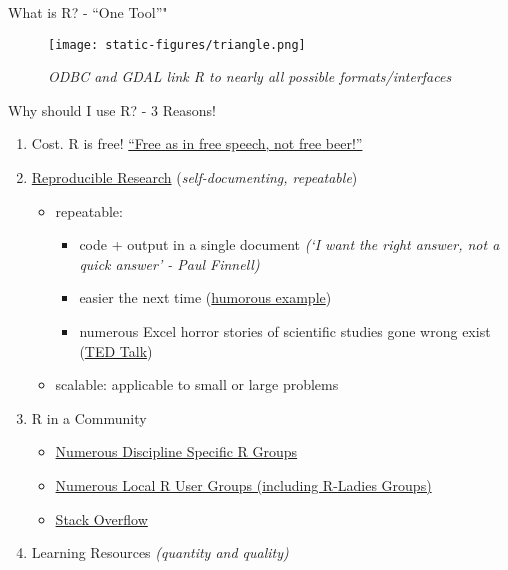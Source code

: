 \documentclass[
  ignorenonframetext,
]{beamer}
\providecommand{\tightlist}{%
  \setlength{\itemsep}{0pt}\setlength{\parskip}{0pt}}
\begin{document}
\begin{frame}{What is R? - ``One Tool''"}
\protect\hypertarget{what-is-r---one-tool}{}
\begin{figure}
\centering
\texttt{[image: static-figures/triangle.png]}
\caption{\emph{ODBC and GDAL link R to nearly all possible
formats/interfaces}}
\end{figure}
\end{frame}

\begin{frame}{Why should I use R? - 3 Reasons!}
\protect\hypertarget{why-should-i-use-r---3-reasons}{}
\begin{enumerate}
\item
  Cost. R is free!
  \href{https://www.gnu.org/philosophy/free-sw.html}{``Free as in free
  speech, not free beer!''}
\item
  \href{http://christophergandrud.github.io/RepResR-RStudio/}{Reproducible
  Research} (\emph{self-documenting, repeatable})

  \begin{itemize}
  \tightlist
  \item
    repeatable:

    \begin{itemize}
    \tightlist
    \item
      code + output in a single document \emph{(`I want the right
      answer, not a quick answer' - Paul Finnell)}
    \item
      easier the next time
      (\href{https://www.youtube.com/watch?time_continue=1\&v=s3JldKoA0zw}{humorous
      example})
    \item
      numerous Excel horror stories of scientific studies gone wrong
      exist (\href{https://www.youtube.com/watch?v=dXKbkpilQME}{TED
      Talk})
    \end{itemize}
  \item
    scalable: applicable to small or large problems
  \end{itemize}
\item
  R in a Community

  \begin{itemize}
  \tightlist
  \item
    \href{https://cran.r-project.org/web/views/}{Numerous Discipline
    Specific R Groups}
  \item
    \href{https://jumpingrivers.github.io/meetingsR/r-user-groups.html\#north-america}{Numerous
    Local R User Groups (including R-Ladies Groups)}
  \item
    \href{https://stackoverflow.com/}{Stack Overflow}
  \end{itemize}
\item
  Learning Resources \emph{(quantity and quality)}


\end{enumerate}
\end{frame}
\end{document}
